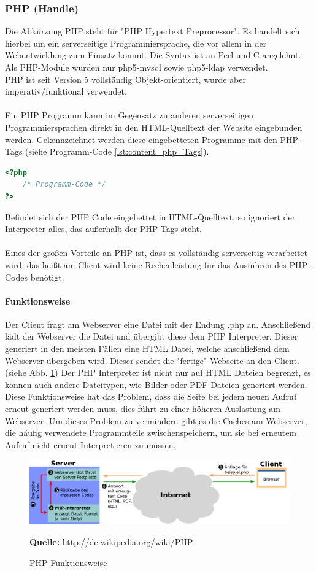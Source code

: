 \subsubsection{PHP (Handle)}
Die Abkürzung PHP steht für "PHP Hypertext Preprocessor". Es handelt sich hierbei um ein serverseitige Programmiersprache, die vor allem in der Webentwicklung zum Einsatz kommt. Die Syntax ist an Perl und C angelehnt.\\
Als PHP-Module wurden nur php5-mysql sowie php5-ldap verwendet.\\
PHP ist seit Version 5 vollständig Objekt-orientiert, wurde aber imperativ/funktional verwendet.\\
\\
Ein PHP Programm kann im Gegensatz zu anderen serverseitigen Programmiersprachen direkt in den HTML-Quelltext der Website eingebunden werden. Gekennzeichnet werden diese eingebetteten Programme mit den PHP-Tags (siehe Programm-Code \ref{lst:content_php_Tags}).\\
\begin{lstlisting}[style=custom, language=PHP,  caption={PHP-Tags},label={lst:content_php_Tags}]
<?php 
	/* Programm-Code */
?>
\end{lstlisting}
Befindet sich der PHP Code eingebettet in HTML-Quelltext, so ignoriert der Interpreter alles, das außerhalb der PHP-Tags steht.\\\\
Eines der großen Vorteile an PHP ist, dass es vollständig serverseitig verarbeitet wird, das heißt am Client wird keine Rechenleistung für das Ausführen des PHP-Codes benötigt.
\paragraph{Funktionsweise}
Der Client fragt am Webserver eine Datei mit der Endung .php an. Anschließend lädt der Webserver die Datei und übergibt diese dem PHP Interpreter. Dieser generiert in den meisten Fällen eine HTML Datei, welche anschließend dem Webserver übergeben wird. Dieser sendet die "fertige" Webseite an den Client. (siehe Abb. \ref{fig:content_php_PHP_Funktion}) Der PHP Interpreter ist nicht nur auf HTML Dateien begrenzt, es können auch andere Dateitypen, wie Bilder oder PDF Dateien generiert werden. Diese Funktionsweise hat das Problem, dass die Seite bei jedem neuen Aufruf erneut generiert werden muss, dies führt zu einer höheren Auslastung am Webserver. Um dieses Problem zu vermindern gibt es die Caches am Webserver, die häufig verwendete Programmteile zwischenspeichern, um sie bei erneutem Aufruf nicht erneut Interpretieren zu müssen.
\begin{figure}[H]
\centering
\includegraphics[keepaspectratio=true, width=14cm]{images/PHP_Funktionsweise.png}
\caption{PHP Funktionsweise}
\label{fig:content_php_PHP_Funktion}
\textbf{Quelle:} http://de.wikipedia.org/wiki/PHP
\end{figure}
